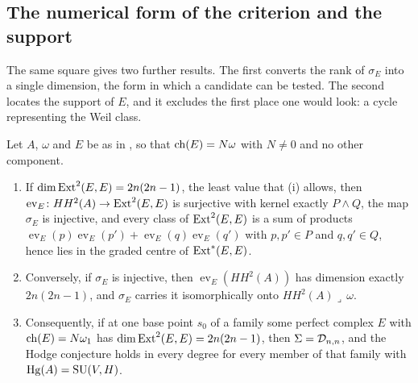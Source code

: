 \subsection{The numerical form of the criterion and the support}

The same square gives two further results. The first converts the rank of
$\sigma_{E}$ into a single dimension, the form in which a candidate can be
tested. The second locates the support of $E$, and it excludes the first
place one would look: a cycle representing the Weil class.

\begin{theorem}\label{thm:p2numerical}
Let $A$, $\omega$ and $E$ be as in , so that
$\operatorname{ch}(E)=N\omega$ with $N\ne0$ and no other component.
\begin{enumerate}[label=\textup{(\roman*)},leftmargin=2.6em,itemsep=2pt]
\item If $\dim\operatorname{Ext}^{2}(E,E)=2n(2n-1)$, the least value that
  (i) allows, then $\operatorname{ev}_{E}\colon
  HH^{2}(A)\to\operatorname{Ext}^{2}(E,E)$ is surjective with kernel exactly $P\wedge Q$,
  the map $\sigma_{E}$ is injective, and every class of $\operatorname{Ext}^{2}(E,E)$ is a
  sum of products $\operatorname{ev}_{E}(p)\operatorname{ev}_{E}(p')
  +\operatorname{ev}_{E}(q)\operatorname{ev}_{E}(q')$ with $p,p'\in P$ and
  $q,q'\in Q$, hence lies in the graded centre of $\operatorname{Ext}^{*}(E,E)$.
\item Conversely, if $\sigma_{E}$ is injective, then
  $\operatorname{ev}_{E}(HH^{2}(A))$ has dimension exactly $2n(2n-1)$, and
  $\sigma_{E}$ carries it isomorphically onto $HH^{2}(A)\lrcorner\,\omega$.
\item Consequently, if at one base point $s_{0}$ of a family some perfect
  complex $E$ with $\operatorname{ch}(E)=N\omega_{1}$ has $\dim\operatorname{Ext}^{2}(E,E)=2n(2n-1)$,
  then $\Sigma=\mathcal{D}_{n,n}$, and the Hodge conjecture holds in every degree for
  every member of that family with $\operatorname{Hg}(A)=\operatorname{SU}(V,H)$.
\end{enumerate}
\end{theorem}


